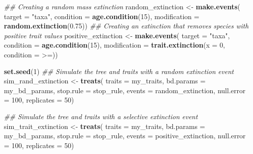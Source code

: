 \documentclass[
]{article}
\newenvironment{Shaded}{\begin{snugshade}}{\end{snugshade}}
\newcommand{\CommentTok}[1]{\textcolor[rgb]{0.56,0.35,0.01}{\textit{#1}}}
\newcommand{\DataTypeTok}[1]{\textcolor[rgb]{0.13,0.29,0.53}{#1}}
\newcommand{\DecValTok}[1]{\textcolor[rgb]{0.00,0.00,0.81}{#1}}
\newcommand{\FloatTok}[1]{\textcolor[rgb]{0.00,0.00,0.81}{#1}}
\newcommand{\KeywordTok}[1]{\textcolor[rgb]{0.13,0.29,0.53}{\textbf{#1}}}
\newcommand{\NormalTok}[1]{#1}
\newcommand{\StringTok}[1]{\textcolor[rgb]{0.31,0.60,0.02}{#1}}
\begin{document}
\begin{Shaded}
\begin{Highlighting}[]
\CommentTok{\#\# Creating a random mass extinction}
\NormalTok{random\_extinction \textless{}{-}}\StringTok{ }\KeywordTok{make.events}\NormalTok{(}
    \DataTypeTok{target       =} \StringTok{"taxa"}\NormalTok{,}
    \DataTypeTok{condition    =} \KeywordTok{age.condition}\NormalTok{(}\DecValTok{15}\NormalTok{),}
    \DataTypeTok{modification =} \KeywordTok{random.extinction}\NormalTok{(}\FloatTok{0.75}\NormalTok{))}
\CommentTok{\#\# Creating an extinction that removes species with positive trait values}
\NormalTok{positive\_extinction \textless{}{-}}\StringTok{ }\KeywordTok{make.events}\NormalTok{(}
    \DataTypeTok{target =} \StringTok{"taxa"}\NormalTok{,}
    \DataTypeTok{condition =} \KeywordTok{age.condition}\NormalTok{(}\DecValTok{15}\NormalTok{),}
    \DataTypeTok{modification =} \KeywordTok{trait.extinction}\NormalTok{(}\DataTypeTok{x =} \DecValTok{0}\NormalTok{, }\DataTypeTok{condition =} \StringTok{\textasciigrave{}}\DataTypeTok{\textgreater{}=}\StringTok{\textasciigrave{}}\NormalTok{))}

\KeywordTok{set.seed}\NormalTok{(}\DecValTok{1}\NormalTok{)}
\CommentTok{\#\# Simulate the tree and traits with a random extinction event}
\NormalTok{sim\_rand\_extinction \textless{}{-}}\StringTok{ }\KeywordTok{treats}\NormalTok{(}
                   \DataTypeTok{traits     =}\NormalTok{ my\_traits,}
                   \DataTypeTok{bd.params  =}\NormalTok{ my\_bd\_params,}
                   \DataTypeTok{stop.rule  =}\NormalTok{ stop\_rule,}
                   \DataTypeTok{events     =}\NormalTok{ random\_extinction,}
                   \DataTypeTok{null.error =} \DecValTok{100}\NormalTok{,}
                   \DataTypeTok{replicates =} \DecValTok{50}\NormalTok{)}

\CommentTok{\#\# Simulate the tree and traits with a selective extinction event}
\NormalTok{sim\_trait\_extinction \textless{}{-}}\StringTok{ }\KeywordTok{treats}\NormalTok{(}
                   \DataTypeTok{traits     =}\NormalTok{ my\_traits,}
                   \DataTypeTok{bd.params  =}\NormalTok{ my\_bd\_params,}
                   \DataTypeTok{stop.rule  =}\NormalTok{ stop\_rule,}
                   \DataTypeTok{events     =}\NormalTok{ positive\_extinction,}
                   \DataTypeTok{null.error =} \DecValTok{100}\NormalTok{,}
                   \DataTypeTok{replicates =} \DecValTok{50}\NormalTok{)}
\end{Highlighting}
\end{Shaded}
\end{document}
